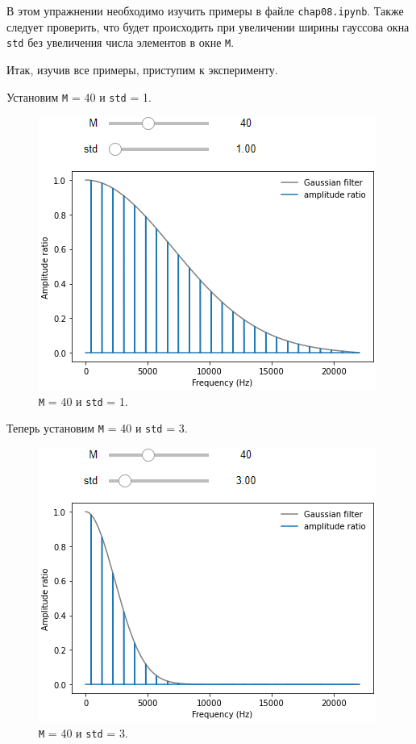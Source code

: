 \documentclass[a4paper, 14pt]{extarticle}
\begin{document}
    В этом упражнении необходимо изучить примеры в файле \texttt{chap08.ipynb}. Также следует проверить, что будет
    происходить при увеличении ширины гауссова окна \texttt{std} без увеличения числа элементов в окне \texttt{M}.

    Итак, изучив все примеры, приступим к эксперименту.

    Установим \texttt{M} = 40 и \texttt{std} = 1.

    \begin{figure}[h]
        \centering
        \includegraphics[width=0.8\linewidth]{resources/Images/task1_check_m40_std1}
        \caption{\texttt{M} = 40 и \texttt{std} = 1.}
        \label{fig:task1_check_m40_std1}
    \end{figure}

    Теперь установим \texttt{M} = 40 и \texttt{std} = 3.

    \begin{figure}[H]
        \centering
        \includegraphics[width=0.75\linewidth]{resources/Images/task1_check_m40_std3}
        \caption{\texttt{M} = 40 и \texttt{std} = 3.}
        \label{fig:task1_check_m40_std3}
    \end{figure}
\end{document}
